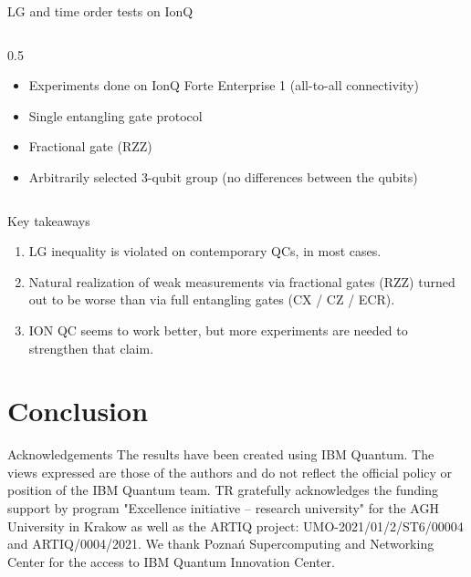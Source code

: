 \documentclass{beamer}
\begin{document}
\begin{frame}{LG and time order tests on IonQ}
\begin{columns}
			\begin{column}{0.5\textwidth}
					
					\begin{itemize}

						\item Experiments done on IonQ Forte Enterprise 1 (all-to-all connectivity)
						
						\item Single entangling gate protocol
						
						\item Fractional gate (RZZ)
						
						\item Arbitrarily selected 3-qubit group (no differences between the qubits)
						
					\end{itemize}
				
			\end{column}
		\end{columns}
		
	\end{frame}
	
	\begin{frame}{Key takeaways}
		
		\begin{enumerate}
		
			\item LG inequality is violated on contemporary QCs, in most cases.

			\item Natural realization of weak measurements via fractional gates (RZZ) turned out to be worse than via full entangling gates (CX / CZ / ECR).
			
			\item ION QC seems to work better, but more experiments are needed to strengthen that claim.
			
		\end{enumerate}
		
	\end{frame}
	
\section{Conclusion}

	\begin{frame}{Acknowledgements}
		The results have been created using IBM Quantum. The views expressed are those of the
		authors and do not reflect the official policy or position of the IBM Quantum team.
		TR gratefully acknowledges the funding support by program "{}Excellence
		initiative -- research university"{} for the AGH University in Krakow as well as the
		ARTIQ project: UMO-2021/01/2/ST6/00004 and ARTIQ/0004/2021. We thank 	
		Poznań Supercomputing and Networking Center	for the access to IBM Quantum Innovation Center.
	\end{frame}
\end{document}
